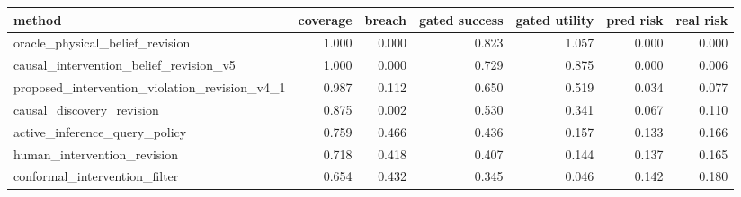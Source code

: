 \begin{tabular}{lrrrrrr}
\toprule
method & coverage & breach & gated success & gated utility & pred risk & real risk \\
\midrule
oracle\_physical\_belief\_revision & 1.000 & 0.000 & 0.823 & 1.057 & 0.000 & 0.000 \\
causal\_intervention\_belief\_revision\_v5 & 1.000 & 0.000 & 0.729 & 0.875 & 0.000 & 0.006 \\
proposed\_intervention\_violation\_revision\_v4\_1 & 0.987 & 0.112 & 0.650 & 0.519 & 0.034 & 0.077 \\
causal\_discovery\_revision & 0.875 & 0.002 & 0.530 & 0.341 & 0.067 & 0.110 \\
active\_inference\_query\_policy & 0.759 & 0.466 & 0.436 & 0.157 & 0.133 & 0.166 \\
human\_intervention\_revision & 0.718 & 0.418 & 0.407 & 0.144 & 0.137 & 0.165 \\
conformal\_intervention\_filter & 0.654 & 0.432 & 0.345 & 0.046 & 0.142 & 0.180 \\
\bottomrule
\end{tabular}
